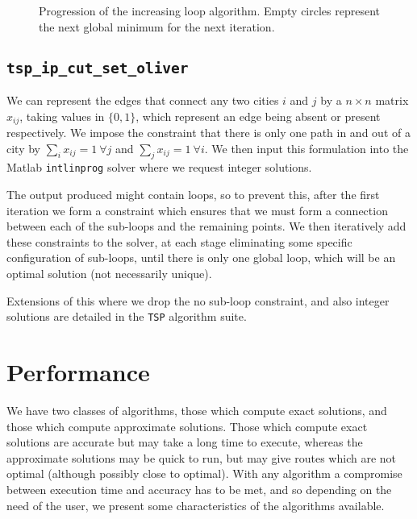 \documentclass[a4paper, 11pt]{article}
\begin{document}
\begin{figure}[htb]
\centering

\caption{Progression of the increasing loop algorithm. Empty circles  represent the next global minimum for the next iteration.}
\label{fig:increasing_loop}
\end{figure}


\subsection{\texttt{tsp\_ip\_cut\_set\_oliver}}
\label{subsec:tsp_ip_cut_set_oliver}

We can represent the edges that connect any two cities $ i $ and $ j $ by a $ n \times n $ matrix $ x_{ij} $, taking values in $ \{0, 1\} $, which represent an edge being absent or present respectively. We impose the constraint that there is only one path in and out of a city by $ \sum_{i} x_{ij} = 1 \: \forall j $ and  $ \sum_{j} x_{ij} = 1 \: \forall i $. We then input this formulation into the Matlab \verb|intlinprog| solver where we request integer solutions.

The output produced might contain loops, so to prevent this, after the first iteration we form a constraint which ensures that we must form a connection between each of the sub-loops and the remaining points. We then iteratively add these constraints to the solver, at each stage eliminating some specific configuration of sub-loops, until there is only one global loop, which will be an optimal solution (not necessarily unique).

Extensions of this where we drop the no sub-loop constraint, and also integer solutions are detailed in the \texttt{TSP} algorithm suite.

\section{Performance}
\label{sec:performance}

We have two classes of algorithms, those which compute exact solutions, and those which compute approximate solutions. Those which compute exact solutions are accurate but may take a long time to execute, whereas the approximate solutions may be quick to run, but may give routes which are not optimal (although possibly close to optimal). With any algorithm a compromise between execution time and accuracy has to be met, and so  depending on the need of the user, we present some characteristics of the algorithms available.
\end{document}
